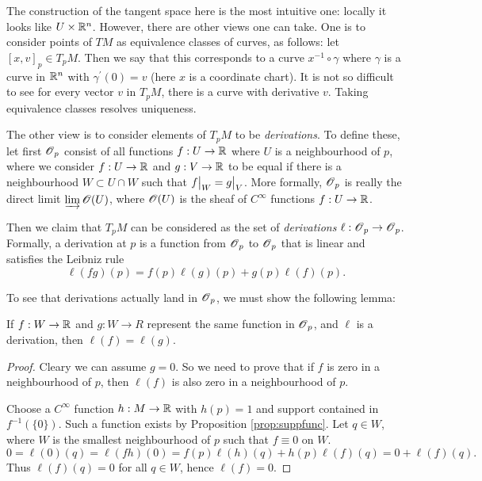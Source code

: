 \documentclass[11pt, english]{article}
\begin{document}
The construction of the tangent space here is the most intuitive one: locally it looks like $U \times \mathbb{R}^n$. However, there are other views one can take. One is to consider points of $TM$ as equivalence classes of curves, as follows: let $[x,v]_p \in T_pM$. Then we say that this corresponds to a curve $x^{-1} \circ \gamma$ where $\gamma$ is a curve in $\mathbb{R}^n$ with $\gamma^\prime(0) = v$ (here $x$ is a coordinate chart). It is not so difficult to see for every vector $v$ in $T_pM$, there is a curve with derivative $v$. Taking equivalence classes resolves uniqueness.

The other view is to consider elements of $T_pM$ to be \emph{derivations}. To define these, let first $\operatorname{\mathscr{O}}_p$ consist of all functions $f:U \to \mathbb{R}$ where $U$ is a neighbourhood of $p$, where we consider $f:U \to \mathbb{R}$ and $g:V \to \mathbb{R}$ to be equal if there is a neighbourhood $W \subset U \cap W$ such that $\restr{f}{W} = \restr{g}{V}$. More formally, $\operatorname{\mathscr{O}}_p$ is really the direct limit $\varinjlim \operatorname{\mathscr{O}}(U)$, where $\operatorname{\mathscr{O}}(U)$ is the sheaf of $C^\infty$ functions $f:U \to \mathbb{R}$.

Then we claim that $T_pM$ can be considered as the set of \emph{derivations} $\ell:\operatorname{\mathscr{O}}_p \to \operatorname{\mathscr{O}}_p$. Formally, a derivation at $p$ is a function from $\operatorname{\mathscr{O}}_p$ to $\operatorname{\mathscr{O}}_p$ that is linear and satisfies the Leibniz rule
\[
\ell(fg)(p) = f(p)\ell(g)(p) + g(p) \ell(f)(p).
\]

To see that derivations actually land in $\operatorname{\mathscr{O}}_p$, we must show the following lemma:
\begin{lemma}
If $f:W \to \mathbb{R}$ and $g:W \to R$ represent the same function in $\operatorname{\mathscr{O}}_p$, and $\ell$ is a derivation, then $\ell(f)=\ell(g)$.
\end{lemma}
\begin{proof}
Cleary we can assume $g=0$. So we need to prove that if $f$ is zero in a neighbourhood of $p$, then $\ell(f)$ is also zero in a neighbourhood of $p$.

Choose a $C^\infty$ function $h:M \to \mathbb{R}$ with $h(p)=1$ and support contained in $f^{-1}(\{ 0\})$. Such a function exists by Proposition \ref{prop:suppfunc}. Let $q \in W$, where $W$ is the smallest neighbourhood of $p$ such that $f \equiv 0$ on $W$.
\[
0 = \ell(0)(q) = \ell(fh)(0) = f(p)\ell(h)(q)+h(p)\ell(f)(q) = 0 + \ell(f)(q).
\]
Thus $\ell(f)(q)=0$ for all $q \in W$, hence $\ell(f)=0$.
\end{proof}
\end{document}
